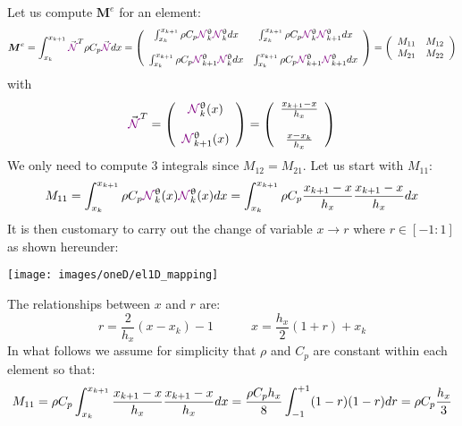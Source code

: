 Let us compute ${\bm M}^e$ for an element:
\[
{\bm M}^e
= \int_{x_k}^{x_{k+1}}   {\vec {\color{violet}{\mathcal{N}}}}^T \rho C_p {\vec {\color{violet}{\mathcal{N}}}} dx  
=
\left(
\begin{array}{cc}
\int_{x_k}^{x_{k+1}} \rho C_p {\color{violet}{\mathcal{N}}}_k^\uptheta {\color{violet}{\mathcal{N}}}_{k}^\uptheta dx   
&  \int_{x_k}^{x_{k+1}} \rho C_p {\color{violet}{\mathcal{N}}}_k^\uptheta {\color{violet}{\mathcal{N}}}_{k+1}^\uptheta dx \\ \\
\int_{x_k}^{x_{k+1}} \rho C_p {\color{violet}{\mathcal{N}}}_{k+1}^\uptheta {\color{violet}{\mathcal{N}}}_{k}^\uptheta dx  
&  \int_{x_k}^{x_{k+1}} \rho C_p {\color{violet}{\mathcal{N}}}_{k+1}^\uptheta {\color{violet}{\mathcal{N}}}_{k+1}^\uptheta dx 
\end{array}
\right)
=
\left(
\begin{array}{cc}
M_{11} & M_{12} \\
M_{21} & M_{22} 
\end{array}
\right)
\]
with 
\[
{\vec {\color{violet}{\mathcal{N}}}}^T = 
\left(
\begin{array}{c}
{\color{violet}{\mathcal{N}}}_k^\uptheta(x)  \\ \\  
{\color{violet}{\mathcal{N}}}_{k+1}^\uptheta(x)
\end{array}
\right)
=
\left(
\begin{array}{c}
\frac{x_{k+1}-x}{h_x}   \\ \\
\frac{x-x_k}{h_x} 
\end{array}
\right)
\]
We only need to compute 3 integrals since $M_{12}=M_{21}$.
Let us start with $M_{11}$:
\[
M_{11}=\int_{x_k}^{x_{k+1}} \rho C_p {\color{violet}{\mathcal{N}}}_k^\uptheta(x) 
{\color{violet}{\mathcal{N}}}_{k}^\uptheta(x) dx
=   
\int_{x_k}^{x_{k+1}} \rho C_p 
\frac{x_{k+1}-x}{h_x}  
\frac{x_{k+1}-x}{h_x}  
dx
\]
It is then customary to carry out the change of variable $x \rightarrow r$ where 
$r \in [-1:1]$ as shown hereunder:
\begin{center}
\texttt{[image: images/oneD/el1D\_mapping]}
\end{center}
The relationships between $x$ and $r$ are:
\[
r=\frac{2}{h_x}(x-x_k)-1
\quad\quad\quad
x=\frac{h_x}{2}(1+r)+x_k
\]
In what follows we assume for simplicity that $\rho$ and $C_p$ are constant within each element so that:
\[
M_{11}=
\rho C_p
\int_{\tiny x_k}^{x_{k+1}} 
\frac{x_{k+1}-x}{h_x}  
\frac{x_{k+1}-x}{h_x}  
dx
=  \frac{\rho C_p h_x}{8} \int_{-1}^{+1} (1-r) (1-r)  dr  = \rho C_p \frac{h_x}{3} 
\]

